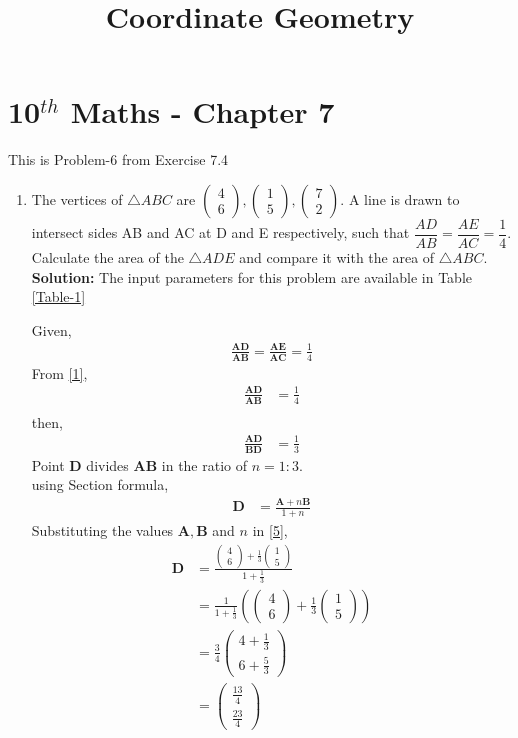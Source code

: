 \documentclass[12pt]{article}
\providecommand{\brak}[1]{\ensuremath{\left(#1\right)}}
\newcommand{\solution}{\noindent \textbf{Solution: }}
\newcommand{\myvec}[1]{\ensuremath{\begin{pmatrix}#1\end{pmatrix}}}
\let\vec\mathbf
\begin{document}
\begin{center}
\title{\textbf{Coordinate Geometry}}
\date{\vspace{-5ex}} %
\maketitle
\end{center}
\setcounter{page}{1}
\section*{10$^{th}$ Maths - Chapter 7}
This is Problem-6 from Exercise 7.4
\begin{enumerate}
\item The vertices of $\triangle ABC$ are $\myvec{4 \\ 6}, \myvec{1\\5}, \myvec{7\\2}$. A line is drawn to intersect sides AB and AC at D and E respectively, such that $\dfrac{AD}{AB}=\dfrac{AE}{AC}=\dfrac{1}{4}$. Calculate the area of the $\triangle ADE$ and compare it with the area of $\triangle ABC$.\\
\solution The input parameters for this problem are available in Table \eqref{Table-1}
\begin{table}[ht!]\centering

\caption{}
\label{Table-1}	
\end{table}


Given,
\begin{align}
\frac{\vec{A}\vec{D}}{\vec{A}\vec{B}}=\frac{\vec{A}\vec{E}}{\vec{A}\vec{C}}=\frac{1}{4}\label{1}
\end{align}
From \eqref{1},
\begin{align}
\frac{\vec{A}\vec{D}}{\vec{A}\vec{B}} &=\frac{1}{4}\\
\end{align}
then,
\begin{align}
\frac{\vec{A}\vec{D}}{\vec{B}\vec{D}} &=\frac{1}{3}
\end{align}
Point $\vec{D}$ divides $\vec{A}\vec{B}$ in the ratio of $n = 1:3$.\\
using Section formula,
\begin{align}
\vec{D} &=\frac{\vec{A}+n\vec{B}}{1+n}\label{5}
\end{align}
Substituting the values $\vec{A},\vec{B}$ and $n$ in \eqref{5},
\begin{align}
\vec{D} &=\frac{{\myvec{4\\6}+\frac{1}{3}\myvec{1\\5}}}{1+\frac{1}{3}}\\
	&=\frac{1}{1+\frac{1}{3}}\brak{{\myvec{4\\6}+\frac{1}{3}\myvec{1\\5}}} \\
	&=\frac{3}{4}\myvec{4+\frac{1}{3}\\6+\frac{5}{3}}\\
	&=\myvec{\frac{13}{4}\\ \frac{23}{4}}
\end{align}


\end{enumerate}
\end{document}

